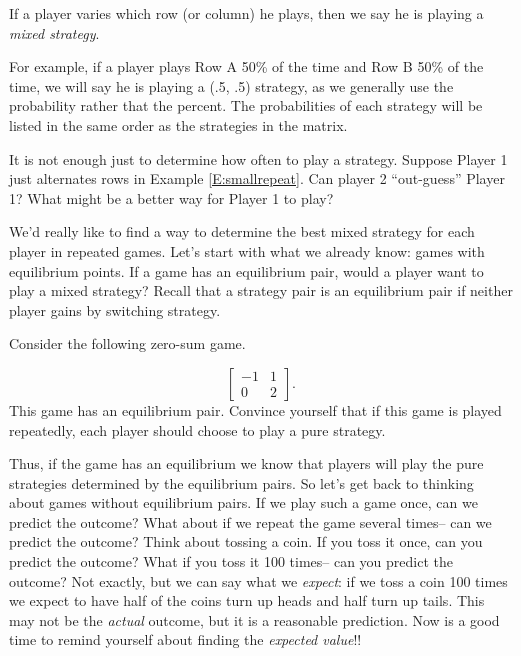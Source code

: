 \begin{definition}
If a player varies which row (or column) he plays, then we say he is playing a \emph{mixed strategy}.
\end{definition}

For example, if a player plays Row A 50\% of the time and Row B 50\% of the time, we will say he is playing a (.5, .5) strategy, as we generally use the probability rather that the percent.  The probabilities of each strategy will be listed in the same order as the strategies in the matrix.

It is not enough just to determine how often to play a strategy. Suppose Player 1 just alternates rows in Example \ref{E:smallrepeat}. Can player 2 ``out-guess'' Player 1? What might be a better way for Player 1 to play?

We'd really like to find a way to determine the best mixed strategy for each player in repeated games. Let's start with what we already know: games with equilibrium points. If a game has an equilibrium pair, would a player want to play a mixed strategy?  Recall that a strategy pair is an equilibrium pair if neither player gains by switching strategy. 

\begin{example}\label{E:repeatequil} Consider the following zero-sum game.

\[\left[\begin{matrix}
-1&1\\
0&2

\end{matrix}\right].\]
This game has an equilibrium pair. Convince yourself that if this game is played repeatedly, each player should  choose to play a pure strategy.
\end{example}

Thus, if the game has an equilibrium we know that players will play the pure strategies determined by the equilibrium pairs. So let's get back to thinking about games without equilibrium pairs. If we play such a game once, can we predict the outcome? What about if we repeat the game several times-- can we predict the outcome? Think about tossing a coin. If you toss it once, can you predict the outcome? What if you toss it 100 times-- can you predict the outcome? Not exactly, but we can say what we \emph{expect}: if we toss a coin 100 times we expect to have half of the coins turn up heads and half turn up tails. This may not be the \emph{actual} outcome, but it is a reasonable prediction. Now is a good time to remind yourself about finding the \emph{expected value}!!